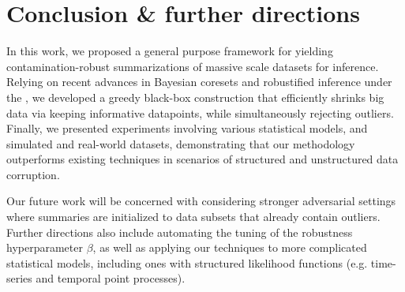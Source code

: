 \section{Conclusion \& further directions}
\label{sec:conclusion}
In this work, we proposed a general purpose framework for yielding  contamination-robust summarizations of massive scale datasets for inference. Relying on recent advances in Bayesian coresets and robustified inference under the \bdiv{}, we developed a greedy black-box construction that efficiently shrinks big data via keeping informative datapoints, while simultaneously rejecting outliers.
 Finally, we presented experiments involving various statistical models, and simulated and real-world datasets, demonstrating that our methodology outperforms existing techniques in scenarios of structured and unstructured data corruption. 

Our future work will be concerned with considering stronger adversarial settings where summaries are initialized to data subsets that already contain outliers. Further directions also include automating the tuning of the robustness hyperparameter $\beta$, as well as applying our techniques to more complicated statistical models, including ones with structured likelihood functions (e.g. time-series and temporal point processes).